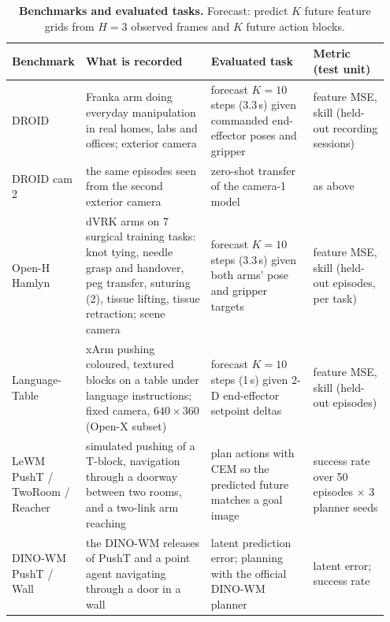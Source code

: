 \begin{table}[h]
\centering\scriptsize\setlength{\tabcolsep}{3pt}
\caption{\textbf{Benchmarks and evaluated tasks.} Forecast: predict $K$ future feature grids from $H{=}3$ observed frames and $K$ future action blocks.}
\label{tab:tasks}
\begin{tabular}{@{}p{0.15\linewidth}p{0.33\linewidth}p{0.27\linewidth}p{0.2\linewidth}@{}}
\toprule
Benchmark & What is recorded & Evaluated task & Metric (test unit) \\
\midrule
DROID & Franka arm doing everyday manipulation in real homes, labs and offices; exterior camera & forecast $K{=}10$ steps (3.3\,s) given commanded end-effector poses and gripper & feature MSE, skill (held-out recording sessions) \\
DROID cam 2 & the same episodes seen from the second exterior camera & zero-shot transfer of the camera-1 model & as above \\
Open-H Hamlyn & dVRK arms on 7 surgical training tasks: knot tying, needle grasp and handover, peg transfer, suturing (2), tissue lifting, tissue retraction; scene camera & forecast $K{=}10$ steps (3.3\,s) given both arms' pose and gripper targets & feature MSE, skill (held-out episodes, per task) \\
Language-Table & xArm pushing coloured, textured blocks on a table under language instructions; fixed camera, $640{\times}360$ (Open-X subset) & forecast $K{=}10$ steps (1\,s) given 2-D end-effector setpoint deltas & feature MSE, skill (held-out episodes) \\
LeWM PushT / TwoRoom / Reacher & simulated pushing of a T-block, navigation through a doorway between two rooms, and a two-link arm reaching & plan actions with CEM so the predicted future matches a goal image & success rate over 50 episodes $\times$ 3 planner seeds \\
DINO-WM PushT / Wall & the DINO-WM releases of PushT and a point agent navigating through a door in a wall & latent prediction error; planning with the official DINO-WM planner & latent error; success rate \\
\bottomrule
\end{tabular}
\end{table}
